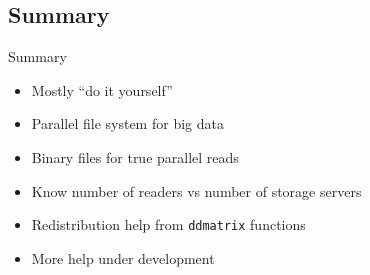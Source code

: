 \subsection{Summary}
\makesubcontentsslidessec


\begin{frame}
  \begin{block}{Summary}
    \begin{itemize}
      \item Mostly ``do it yourself''
      \item Parallel file system for big data
      \item Binary files for true parallel reads
      \item Know number of readers vs number of storage servers
      \item Redistribution help from {\tt ddmatrix} functions
      \item More help under development
    \end{itemize}
  \end{block}
\end{frame}
